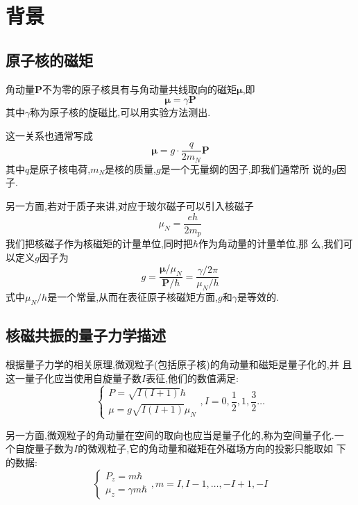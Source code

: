 \documentclass[aps,pre,12pt,preprint,onecolumn,showpacs,showkeys]{revtex4-1}
\begin{document}
\section{背景}

\subsection{原子核的磁矩}

角动量$\bm{P}$不为零的原子核具有与角动量共线取向的磁矩$\bm{\mu}$,即
\begin{equation}
\bm{\mu} = \gamma\bm{P}  
\end{equation}
其中$\gamma$称为原子核的旋磁比,可以用实验方法测出.

这一关系也通常写成
\begin{equation}
\bm{\mu} = g\cdot\frac{q}{2m_N}\bm{P}
\end{equation}
其中$q$是原子核电荷,$m_N$是核的质量,$g$是一个无量纲的因子,即我们通常所
说的$g$因子.

另一方面,若对于质子来讲,对应于玻尔磁子可以引入核磁子
\begin{equation}
\mu_N = \frac{eh}{2m_p}
\end{equation}
我们把核磁子作为核磁矩的计量单位,同时把$\hbar$作为角动量的计量单位,那
么,我们可以定义$g$因子为
\begin{equation}
g = \frac{\bm{\mu}/\mu_N}{\bm{P}/\hbar} =
\frac{\gamma/2\pi}{\mu_N/h}
\end{equation}
式中$\mu_N/h$是一个常量,从而在表征原子核磁矩方面,$g$和$\gamma$是等效的.

\subsection{核磁共振的量子力学描述}

根据量子力学的相关原理,微观粒子(包括原子核)的角动量和磁矩是量子化的,并
且这一量子化应当使用自旋量子数$I$表征,他们的数值满足:
\begin{equation}
\begin{cases} P = \sqrt{I(I + 1)}\hbar \\
\mu = g \sqrt{I(I+1)}\mu_N \end{cases}, I = 0,\frac{1}{2},1,
\frac{3}{2} \dots
\end{equation}

另一方面,微观粒子的角动量在空间的取向也应当是量子化的,称为空间量子化.一
个自旋量子数为$I$的微观粒子,它的角动量和磁矩在外磁场方向的投影只能取如
下的数据:
\begin{equation}
\begin{cases}P_z = m\hbar \\ 
\mu_z = \gamma m \hbar\end{cases}, m = I, I-1, \dots, -I+1, -I
\end{equation}
\end{document}
